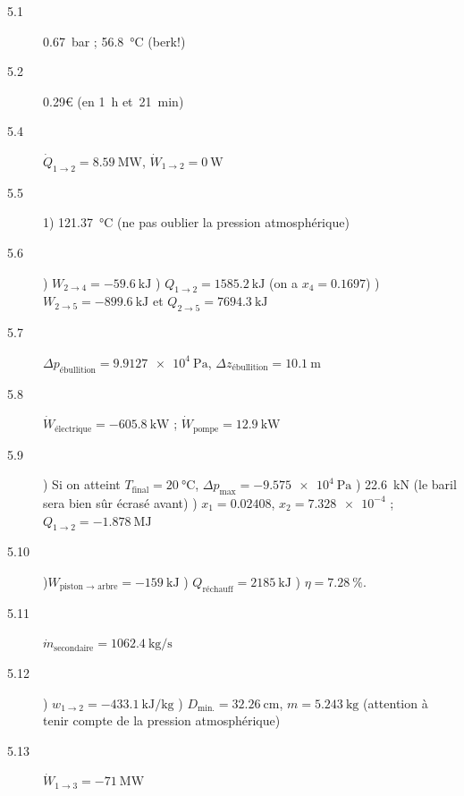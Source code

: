 	\begin{description}
		\item [5.1] \SI{0,67}{\bar} ; \SI{56,8}{\degreeCelsius} (berk!)
		\item [5.2] \num{0,29}\euro{} (en \SI{1}{\hour} et~\SI{21}{\minute})
		\item [5.4] $\dot{Q}_{1 \to 2} = \SI{+8,59}{\mega\watt}$, $\dot{W}_{1 \to 2} = \SI{0}{\watt}$
		\item [5.5] 1) \SI{121,37}{\degreeCelsius} (ne pas oublier la pression atmosphérique)
		\item [5.6] ) ${W}_{2 \to 4} = \SI{-59,6}{\kilo\joule}$ 
						) ${Q}_{1 \to 2} = \SI{+1585,2}{\kilo\joule}$ (on a $x_4 = \num{0,1697}$) 
						) ${W}_{2 \to 5} = \SI{-899,6}{\kilo\joule}$ et ${Q}_{2 \to 5} = \SI{+7694,3}{\kilo\joule}$
		\item [5.7] $\Delta p_\text{ébullition} = \SI{9,9127e4}{\pascal}$, $\Delta z_\text{ébullition} = \SI{10,1}{\metre}$
		\item [5.8] $\dot{W}_\text{électrique} = \SI{-605,8}{\kilo\watt}$ ; $\dot{W}_\text{pompe} = \SI{+12,9}{\kilo\watt}$
		\item [5.9] ) Si on atteint $T_\text{final} = \SI{20}{\degreeCelsius}$, $\Delta p_\text{max} = \SI{-9,575e4}{\pascal}$
						) \SI{22,6}{\kilo\newton} (le baril sera bien sûr écrasé avant)
						)  $x_1 = \num{0,02408}$, $x_2 = \num{7,328e-4}$ ; ${Q}_{1 \to 2} = \SI{-1,878}{\mega\joule}$
		\item [5.10] )${W}_\text{piston $\to$ arbre} = \SI{-159}{\kilo\joule}$
						)  ${Q}_\text{réchauff} = \SI{+2185}{\kilo\joule}$
						) $\eta = \SI{7,28}{\percent}$.
		\item [5.11] $\dot{m}_\text{secondaire} = \SI{1062,4}{\kilogram\per\second}$
		\item [5.12] ) ${w}_{1 \to 2} = \SI{-433,1}{\kilo\joule\per\kilogram}$
						) $D_\text{min.} = \SI{32,26}{\centi\metre}$, $m = \SI{5,243}{\kilogram}$ (attention à tenir compte de la pression atmosphérique)
		\item [5.13] $\dot{W}_{1 \to 3} = \SI{-71}{\mega\watt}$
	\end{description}
